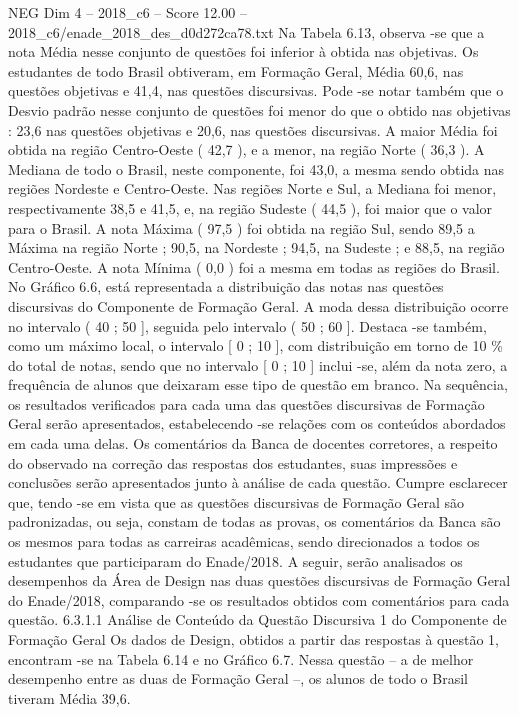 \begin{textsample}{NEG Dim 4 – 2018\_c6 – Score 12.00 – 2018\_c6/enade\_2018\_des\_d0d272ca78.txt}
Na Tabela 6.13, observa -se que a nota Média nesse conjunto de questões foi inferior à obtida nas objetivas.
Os estudantes de todo Brasil obtiveram, em Formação Geral, Média 60,6, nas questões objetivas e 41,4, nas questões discursivas.
Pode -se notar também que o Desvio padrão nesse conjunto de questões foi menor do que o obtido nas objetivas : 23,6 nas questões objetivas e 20,6, nas questões discursivas.
A maior Média foi obtida na região Centro-Oeste ( 42,7 ), e a menor, na região Norte ( 36,3 ).
A Mediana de todo o Brasil, neste componente, foi 43,0, a mesma sendo obtida nas regiões Nordeste e Centro-Oeste.
Nas regiões Norte e Sul, a Mediana foi menor, respectivamente 38,5 e 41,5, e, na região Sudeste ( 44,5 ), foi maior que o valor para o Brasil.
A nota Máxima ( 97,5 ) foi obtida na região Sul, sendo 89,5 a Máxima na região Norte ; 90,5, na Nordeste ; 94,5, na Sudeste ; e 88,5, na região Centro-Oeste.
A nota Mínima ( 0,0 ) foi a mesma em todas as regiões do Brasil.
No Gráfico 6.6, está representada a distribuição das notas nas questões discursivas do Componente de Formação Geral.
A moda dessa distribuição ocorre no intervalo ( 40 ; 50 ], seguida pelo intervalo ( 50 ; 60 ].
Destaca -se também, como um máximo local, o intervalo [ 0 ; 10 ], com distribuição em torno de 10 \% do total de notas, sendo que no intervalo [ 0 ; 10 ] inclui -se, além da nota zero, a frequência de alunos que deixaram esse tipo de questão em branco.
Na sequência, os resultados verificados para cada uma das questões discursivas de Formação Geral serão apresentados, estabelecendo -se relações com os conteúdos abordados em cada uma delas.
Os comentários da Banca de docentes corretores, a respeito do observado na correção das respostas dos estudantes, suas impressões e conclusões serão apresentados junto à análise de cada questão.
Cumpre esclarecer que, tendo -se em vista que as questões discursivas de Formação Geral são padronizadas, ou seja, constam de todas as provas, os comentários da Banca são os mesmos para todas as carreiras acadêmicas, sendo direcionados a todos os estudantes que participaram do Enade/2018.
A seguir, serão analisados os desempenhos da Área de Design nas duas questões discursivas de Formação Geral do Enade/2018, comparando -se os resultados obtidos com comentários para cada questão. 6.3.1.1 Análise de Conteúdo da Questão Discursiva 1 do Componente de Formação Geral Os dados de Design, obtidos a partir das respostas à questão 1, encontram -se na Tabela 6.14 e no Gráfico 6.7.
Nessa questão – a de melhor desempenho entre as duas de Formação Geral –, os alunos de todo o Brasil tiveram Média 39,6.

\end{textsample}
